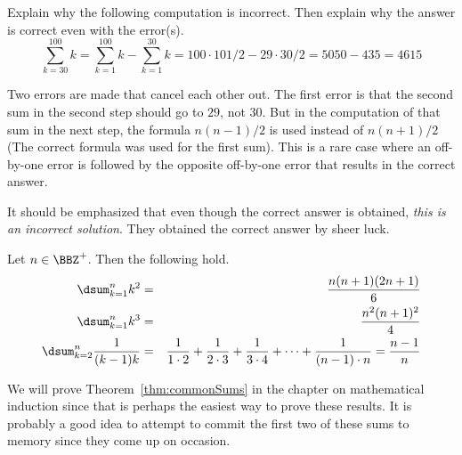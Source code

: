 \begin{ques}
Explain why the following computation is incorrect.  Then explain why 
the answer is correct even with the error(s).
$$\sum_{k=30}^{100} k=
\sum_{k=1}^{100} k - \sum_{k=1}^{30} k=
100\cdot 101/2 - 29\cdot 30/2 = 5050 - 435 =4615
$$

\noindent
\answerlinefour
\begin{answer}
Two errors are made that cancel each other out.
The first error is that the second sum in the second step should go to $29$, not $30$.
But in the computation of that sum in the next step, 
the formula $n(n-1)/2$ is used instead of $n(n+1)/2$
(The correct formula was used for the first sum).
This is a rare case where an off-by-one error is followed by the opposite off-by-one error
that results in the correct answer.

It should be emphasized that even though the correct answer is obtained, 
{\em this is an incorrect solution}.
They obtained the correct answer by sheer luck.
\end{answer}
\end{ques}

%

\newpage %

\begin{thm}\label{thm:commonSums}
Let $n\in\BBZ^{+}$.  Then the following hold.
\begin{eqnarray*}
\dsum _{k=1}^n k^2 &=& \dfrac{n(n+1)(2n+1)}{6}\\
\dsum _{k=1}^n k^3 &=& \dfrac{n^2(n+1)^2}{4}\\
\dsum _{k=2}^n \dfrac{1}{(k-1)k}&=&\dfrac{1}{1\cdot 2} +
\dfrac{1}{2\cdot 3} + \dfrac{1}{3\cdot 4} + \cdots +
\dfrac{1}{(n-1)\cdot n} = \dfrac{n-1}{n}
\end{eqnarray*}
\end{thm}
We will prove Theorem~\ref{thm:commonSums} in the chapter on mathematical induction
since that is perhaps the easiest way to prove these results.
It is probably a good idea to attempt to commit the first two of these sums to memory since
they come up on occasion.

